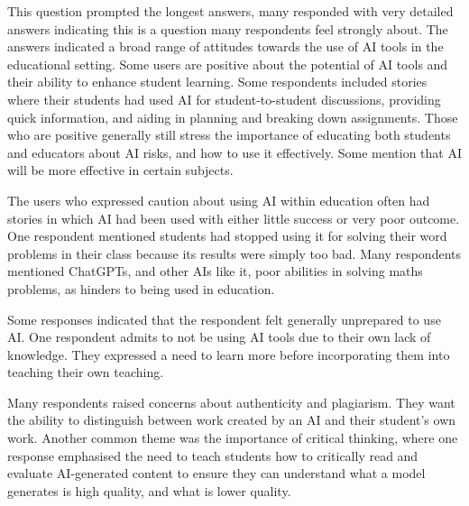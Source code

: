 This question prompted the longest answers, many responded with very detailed answers indicating this is a question many respondents feel strongly about. The answers indicated a broad range of attitudes towards the use of AI tools in the educational setting. Some users are positive about the potential of AI tools and their ability to enhance student learning. Some respondents included stories where their students had used AI for student-to-student discussions, providing quick information, and aiding in planning and breaking down assignments. Those who are positive generally still stress the importance of educating both students and educators about AI risks, and how to use it effectively. Some mention that AI will be more effective in certain subjects.


The users who expressed caution about using AI within education often had stories in which AI had been used with either little success or very poor outcome. One respondent mentioned students had stopped using it for solving their word problems in their class because its results were simply too bad. Many respondents mentioned ChatGPTs, and other AIs like it, poor abilities in solving maths problems, as hinders to being used in education.


Some responses indicated that the respondent felt generally unprepared to use AI. One respondent admits to not be using AI tools due to their own lack of knowledge. They expressed a need to learn more before incorporating them into teaching their own teaching.


Many respondents raised concerns about authenticity and plagiarism. They want the ability to distinguish between work created by an AI and their student’s own work. Another common theme was the importance of critical thinking, where one response emphasised the need to teach students how to critically read and evaluate AI-generated content to ensure they can understand what a model generates is high quality, and what is lower quality.














\cleardoublepage
